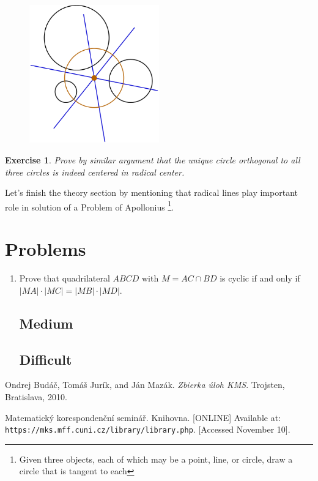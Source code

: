 \documentclass[11pt,a5paper]{article}
\newtheorem{exercise}{Exercise}
\begin{document}
\begin{figure}[h] \begin{center}
\includegraphics[width=0.5\textwidth]{center}
\end{center} \end{figure}


\begin{exercise}
Prove by similar argument that the unique circle orthogonal to all three circles is indeed centered in radical center.
\end{exercise}

\noindent Let's finish the theory section by mentioning that radical lines play important role in solution of a Problem of Apollonius \footnote{Given three objects, each of which may be a point, line, or circle, draw a circle that is tangent to each}.

\section{Problems}


\begin{enumerate}
\subsection*{Easy}

    \item{Prove that quadrilateral $ABCD$ with $M = AC \cap BD$ is cyclic if and only if $|MA|\cdot|MC| = |MB|\cdot|MD|$.}


\subsection*{Medium}
	
	
\subsection*{Difficult}
	

\end{enumerate}

\begin{thebibliography}{9}
 Ondrej Budáč, Tomáš Jurík, and Ján Mazák. 
	\emph{Zbierka úloh KMS}. Trojsten, Bratislava, 2010.
	
 Matematický korespondenční seminář. Knihovna. [ONLINE] Available at: \texttt{https://mks.mff.cuni.cz/library/library.php}. [Accessed November 10].
\end{thebibliography}
\end{document}
